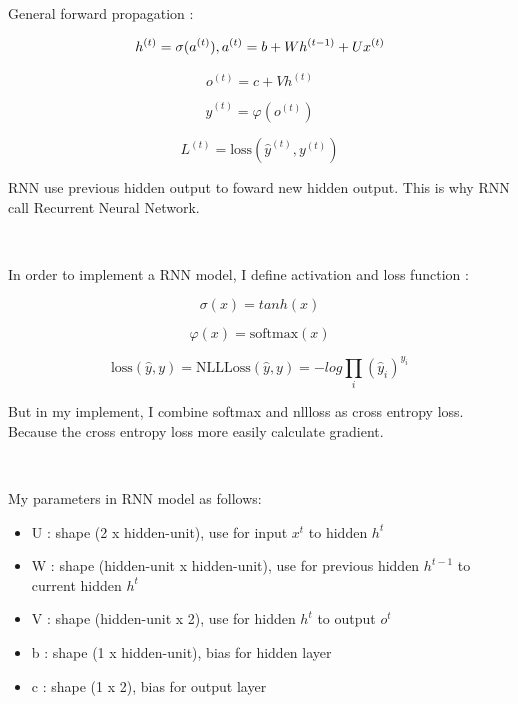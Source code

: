 \documentclass[12pt]{article}
\begin{document}
General forward propagation : 

\begin{equation}
h^{(t)} = \sigma (a^{(t)}), \space a^{(t)} = b + Wh^{(t-1)} + Ux^{(t)}
\end{equation}

\begin{equation}
o^{(t)} = c + Vh^{(t)}
\end{equation}

\begin{equation}
\hat{y}^{(t)} = \varphi(o^{(t)})
\end{equation}

\begin{equation}
L^{(t)} = \text{loss}(\hat{y}^{(t)}, y^{(t)})
\end{equation}

RNN use previous hidden output to foward new hidden output. This is why RNN call Recurrent Neural Network. 
\par \ \par
In order to implement a RNN model, I define activation and loss function :

\begin{equation}
\sigma(x) = tanh(x)
\end{equation}

\begin{equation}
\varphi(x) = \text{softmax}(x)
\end{equation}

\begin{equation}
\text{loss}(\hat{y}, y) = \text{NLLLoss}(\hat{y}, y) = -log \prod_i (\hat{y}_i)^{y_i}
\end{equation}

But in my implement, I combine softmax and nllloss as cross entropy loss. Because the cross entropy loss more easily calculate gradient.
\par \ \par
My parameters in RNN model as follows:

\begin{itemize}
\item U :  shape (2 x hidden-unit), use for input $x^{t}$ to hidden $h^{t}$
\item W : shape (hidden-unit x hidden-unit), use for previous hidden $h^{t-1}$ to current hidden $h^{t}$
\item V : shape (hidden-unit x 2), use for hidden $h^t$ to output $o^t$
\item b : shape (1 x hidden-unit), bias for hidden layer
\item c : shape (1 x 2), bias for output layer
\end{itemize}
\end{document}
